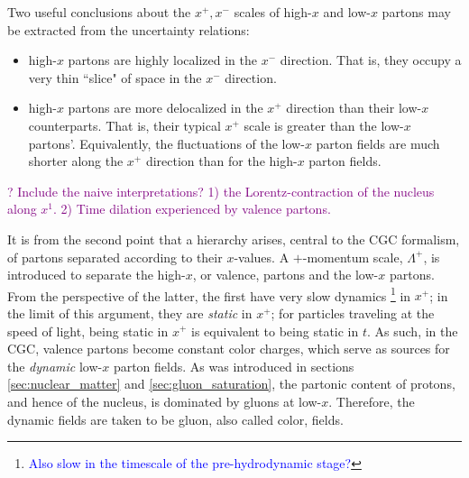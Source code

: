 Two useful conclusions about the $x^+,x^-$  scales of high-$x$ and low-$x$ partons may be extracted from the uncertainty relations:
\begin{itemize}
	\item[1)] high-$x$ partons are highly localized in the $x^-$ direction. That is, they occupy a very thin ``slice" of space in the $x^-$ direction.
	\item[2)] high-$x$ partons are more delocalized in the $x^+$ direction than their low-$x$ counterparts. That is, their typical $x^+$ scale %
is greater than the low-$x$ partons'. Equivalently, the fluctuations of the low-$x$ parton fields are much shorter along the $x^+$ direction than for the high-$x$ parton fields.
\end{itemize}

\textcolor{purple}{? Include the naive \cite{Lappi_notes} interpretations? 1) the Lorentz-contraction of the nucleus along $x^1$. 2) Time dilation experienced by valence partons.}

It is from the second point that a hierarchy arises, central to the \gls{CGC} formalism, of partons separated according to their $x$-values. A $+$-momentum scale, $\Lambda^+$, is introduced to separate the high-$x$, or valence, partons and the low-$x$ partons. From the perspective of the latter, the first have very slow dynamics\textcolor{red}{ \footnote{\textcolor{blue}{Also slow in the timescale of the pre-hydrodynamic stage?}}} in $x^+$; in the limit of this argument, they are \emph{static} in $x^+$; for particles traveling at the speed of light, being static in $x^+$ is equivalent to being static in $t$. As such, in the \gls{CGC}, valence partons become constant color charges, which serve as sources for the \emph{dynamic} low-$x$ parton fields.
As was introduced in sections \ref{sec:nuclear_matter} and \ref{sec:gluon_saturation}, the partonic content of protons, and hence of the nucleus, is dominated by gluons at low-$x$. Therefore, the dynamic fields are taken to be gluon, also called color, fields.


